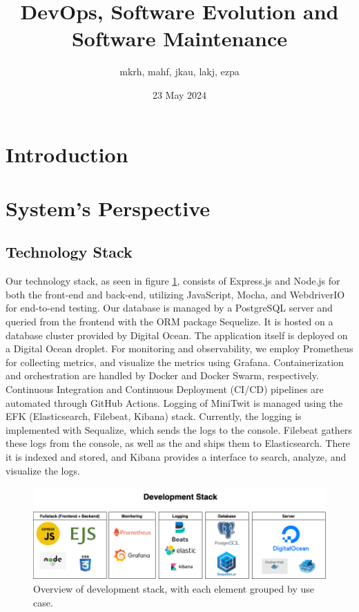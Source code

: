 \documentclass[11pt]{article}
\title{DevOps, Software Evolution and Software Maintenance}
\author{mkrh, mahf, jkau, lakj, ezpa}
\date{23 May 2024}
\begin{document}
\maketitle

\section{Introduction}


\section{System's Perspective}
\subsection{Technology Stack}
Our technology stack, as seen in figure \ref{fig:dev-stack}, consists of Express.js and Node.js for both the front-end and back-end, utilizing JavaScript, Mocha, and WebdriverIO for end-to-end testing. Our database is managed by a PostgreSQL server and queried from the frontend with the ORM package Sequelize. It is hosted on a database cluster provided by Digital Ocean. The application itself is deployed on a Digital Ocean droplet. For monitoring and observability, we employ Prometheus for collecting metrics, and visualize the metrics using Grafana. Containerization and orchestration are handled by Docker and Docker Swarm, respectively. Continuous Integration and Continuous Deployment (CI/CD) pipelines are automated through GitHub Actions. Logging of MiniTwit is managed using the EFK (Elasticsearch, Filebeat, Kibana) stack. Currently, the logging is implemented with Sequalize, which sends the logs to the console.  Filebeat gathers these logs from the console, as well as the  and ships them to Elasticsearch. There it is indexed and stored, and Kibana provides a interface to search, analyze, and visualize the logs.

\begin{figure}[!h]
    \centering
    \includegraphics[width=\textwidth]{report/images/techstack.png}
    \caption{Overview of development stack, with each element grouped by use case.}
    \label{fig:dev-stack}
\end{figure}
\end{document}
